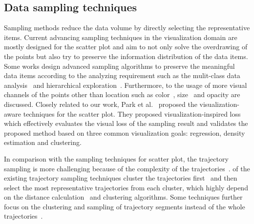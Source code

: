 \subsection{Data sampling techniques}
Sampling methods reduce the data volume by directly selecting the representative items. Current advancing sampling techniques in the visualization domain are mostly designed for the scatter plot and aim to not only solve the overdrawing of the points but also try to preserve the information distribution of the data items. 
Some works design advanced sampling algorithms to preserve the meaningful data items according to the analyzing requirement such as the mulit-class data analysis~\cite{chen2014visual} and hierarchical exploration~\cite{}. Furthermore, to the usage of more visual channels of the points other than location such as color~\cite{chen2014visual}, size~\cite{woodruff1998constant} and opacity are discussed. 
Closely related to our work, Park et al.~\cite{park2016visualization} proposed the visualization-aware techniques for the scatter plot. They proposed visualization-inspired loss which effectively evaluates the visual loss of the sampling result and validates the proposed method based on three common visualization goals:  regression, density estimation and clustering. 

In comparison with the sampling techniques for scatter plot, the trajectory sampling is more challenging because of the complexity of the trajectories~\cite{pelekis2010unsupervised}.  of the existing trajectory sampling techniques cluster the trajectories first~\cite{pelekis2009clustering} and then select the most representative trajectories from each cluster, which highly depend on the distance calculation~\cite{pelekis2007similarity} and clustering algorithms. Some techniques further focus on the clustering and sampling of trajectory segments instead of the whole trajectories~\cite{panagiotakis2011segmentation}. 
